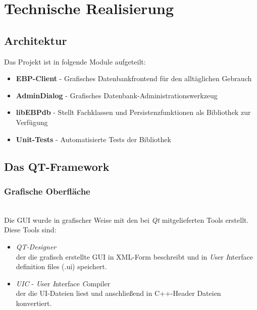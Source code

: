 \section{Technische Realisierung}

\subsection{Architektur}
Das Projekt ist in folgende Module aufgeteilt:
\begin{itemize}
	\item \textbf{EBP-Client} - Grafisches Datenbankfrontend für den alltäglichen Gebrauch
	\item \textbf{AdminDialog} - Grafisches Datenbank-Administrationswerkzeug
	\item \textbf{libEBPdb} - Stellt Fachklassen und Persistenzfunktionen als Bibliothek zur Verfügung
	\item \textbf{Unit-Tests} - Automatisierte Tests der Bibliothek
\end{itemize}

\newpage

\subsection{Das QT-Framework}
\subsubsection{Grafische Oberfläche}\mbox{}\\
Die GUI wurde in grafischer Weise mit den bei \textit{Qt} mitgelieferten Tools erstellt.\\Diese Tools sind:
\begin{itemize}
	\item \textit{QT-Designer}\\[\baselineskip]der die grafisch erstellte GUI in XML-Form beschreibt und in \textit{U}ser \textit{I}nterface definition files (.ui) speichert.
	\item \textit{UIC} - \textit{U}ser \textit{I}nterface \textit{C}ompiler\\[\baselineskip]der die UI-Dateien liest und anschließend in C++-Header Dateien konvertiert.
\end{itemize}
